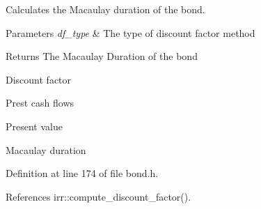 Calculates the Macaulay duration of the bond. 


\begin{DoxyParams}{Parameters}
{\em df\+\_\+type} & The type of discount factor method \\
\hline
\end{DoxyParams}
\begin{DoxyReturn}{Returns}
The Macaulay Duration of the bond 
\end{DoxyReturn}
Discount factor

Prest cash flows

Present value

Macaulay duration 

Definition at line 174 of file bond.\+h.



References irr\+::compute\+\_\+discount\+\_\+factor().


